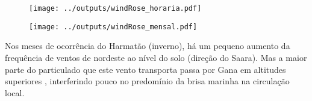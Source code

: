 \begin{figure}[H]
  \centering
  \texttt{[image: ../outputs/windRose\_horaria.pdf]}
  \caption{ \citep{carslaw2012} \label{fig:windRose_horaria}}%
\end{figure}

\begin{figure}[H]
  \centering
  \texttt{[image: ../outputs/windRose\_mensal.pdf]}
  \caption{ \citep{carslaw2012} \label{fig:windRose_mensal}}
\end{figure}

Nos meses de ocorrência do Harmatão (inverno), há um pequeno aumento da frequência de ventos de nordeste ao nível do solo (direção do Saara). Mas a maior parte do particulado que este vento transporta passa por Gana 
em altitudes superiores \citep{breuning2005}, interferindo pouco no predomínio da brisa marinha na circulação local.%
%




%
%
%
